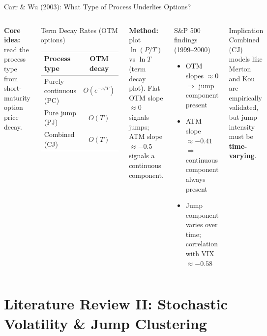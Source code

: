 \documentclass[aspectratio=169,10pt]{beamer}
\begin{document}
\begin{frame}{Carr \& Wu (2003): What Type of Process Underlies Options?}
\begin{columns}[T]
{\small\textbf{Core idea:} read the process type from short-maturity option price decay.}

\smallskip
\begin{block}{Term Decay Rates (OTM options)}
\footnotesize
\begin{tabular}{lc}
\toprule
Process type & OTM decay \\
\midrule
Purely continuous (PC) & $O(e^{-c/T})$ \\
Pure jump (PJ)         & $O(T)$ \\
Combined (CJ)          & $O(T)$ \\
\bottomrule
\end{tabular}
\end{block}

\smallskip
{\footnotesize\textbf{Method:} plot $\ln(P/T)$ vs $\ln T$ (term decay plot). Flat OTM slope $\approx 0$ signals jumps; ATM slope $\approx{-0.5}$ signals a continuous component.}

\begin{block}{S\&P 500 findings (1999--2000)}
\footnotesize
\begin{itemize}\itemsep1pt
  \item OTM slopes $\approx 0$ $\Rightarrow$ jump component present
  \item ATM slope $\approx -0.41$ $\Rightarrow$ continuous component always present
  \item Jump component varies over time; correlation with VIX $\approx -0.58$
\end{itemize}
\end{block}

\begin{alertblock}{Implication}
\footnotesize Combined (CJ) models like Merton and Kou are empirically validated, but jump intensity must be \textbf{time-varying}.
\end{alertblock}
\end{columns}
\end{frame}


\section{Literature Review II: Stochastic Volatility \& Jump Clustering}
\end{document}
